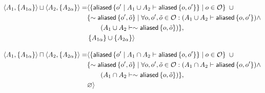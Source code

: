 \begin{align*}
\ctx{A_1}{\set{A_{1\alpha}}} \contextunion \ctx{A_2}{\set{A_{2\alpha}}} =&
\langle
  \set{
    \aliased\set{ o\p \mid A_1 \cup A_2 \entails \aliased\set{o,o\p} }
    \mid
    o \in \O
  } \ \cup \\ &
  \{
    \pnot \aliased\set{o\p, \tilde o}
    \mid
    \forall o, o\p, \tilde o \in \O :
    (A_1 \cup A_2 \entails \aliased\set{o, o\p}) \land \\ & \hspace{2em}
    (A_1 \cup A_2 \entails \pnot \aliased\set{o, \tilde o})
  \}
, \\ &
  \set{A_{1\alpha}} \cup \set{A_{2\alpha}}
\rangle
%
\\[1em]
%
\ctx{A_1}{\set{A_{1\alpha}}} \contextintersection \ctx{A_2}{\set{A_{2\alpha}}} =&
\langle
  \set{
    \aliased\set{ o\p \mid A_1 \cap A_2 \entails \aliased\set{o,o\p} }
    \mid
    o \in \O
  } \ \cup \\ &
  \{
    \pnot \aliased\set{o\p, \tilde o}
    \mid
    \forall o, o\p, \tilde o \in \O :
    (A_1 \cap A_2 \entails \aliased\set{o, o\p}) \land \\ & \hspace{2em}
    (A_1 \cap A_2 \entails \pnot \aliased\set{o, \tilde o})
  \}
, \\ &
  \empty
\rangle
\\
\end{align*}
